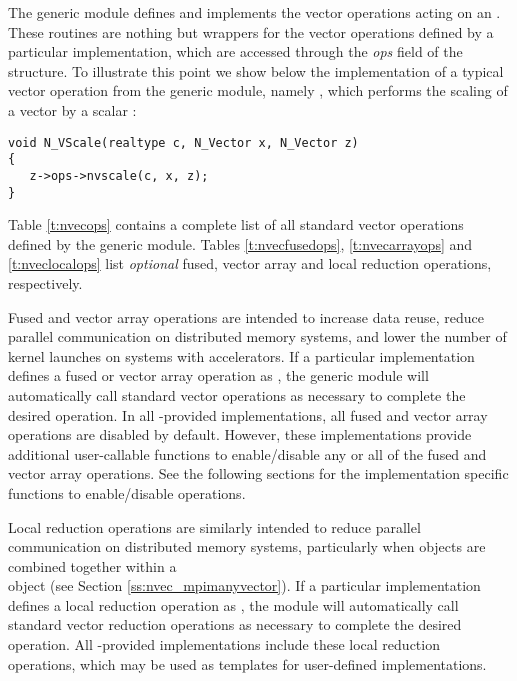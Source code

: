 The generic {\nvector} module defines and implements the vector operations
acting on an .
These routines are nothing but wrappers for the vector operations defined by
a particular {\nvector} implementation, which are accessed through the {\em ops}
field of the  structure. To illustrate this point we
show below the implementation of a typical vector operation from the
generic {\nvector} module, namely , which performs the scaling of a
vector  by a scalar :
\begin{verbatim}
void N_VScale(realtype c, N_Vector x, N_Vector z)
{
   z->ops->nvscale(c, x, z);
}
\end{verbatim}
Table \ref{t:nvecops} contains a complete list of all standard vector
operations defined by the generic {\nvector} module. Tables
\ref{t:nvecfusedops}, \ref{t:nvecarrayops} and \ref{t:nveclocalops}
list \textit{optional} fused, vector array and local reduction
operations, respectively.

Fused and vector array operations are intended to increase data reuse, reduce
parallel communication on distributed memory systems, and lower the number of
kernel launches on systems with accelerators. If a particular {\nvector}
implementation defines a fused or vector array operation as , the
generic {\nvector} module will automatically call standard vector operations as
necessary to complete the desired operation.  In all
{\sundials}-provided {\nvector} implementations, all fused and vector
array operations are disabled by default.  However, these
implementations provide additional user-callable functions to enable/disable
any or all of the fused and vector array operations. See the following sections
for the implementation specific functions to enable/disable operations.

Local reduction operations are similarly intended to reduce parallel
communication on distributed memory systems, particularly when
{\nvector} objects are combined together within a \\
{\nvecmpimanyvector} object (see Section \ref{ss:nvec_mpimanyvector}).  If a
particular {\nvector} implementation defines a local reduction
operation as , the {\nvecmpimanyvector} module will
automatically call standard vector reduction operations as necessary
to complete the desired operation. All {\sundials}-provided {\nvector}
implementations include these local reduction operations, which may be
used as templates for user-defined {\nvector} implementations.

